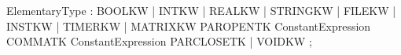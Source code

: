 %
%
%
\begin{rail}
ElementaryType : BOOLKW | INTKW | REALKW | STRINGKW | FILEKW | INSTKW |
                 TIMERKW |
                 MATRIXKW PAROPENTK ConstantExpression COMMATK ConstantExpression PARCLOSETK |
                 VOIDKW
               ;
\end{rail}

